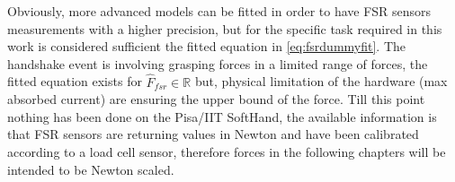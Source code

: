 Obviously, more advanced models can be fitted in order to have FSR sensors measurements with a higher precision, but for the specific task required in this work is considered sufficient the fitted equation in \eqref{eq:fsrdummyfit}. The handshake event is involving grasping forces in a limited range of forces, the fitted equation exists for $ \hat{F}_{fsr} \in \mathbb{R}$ but, physical limitation of the hardware (max absorbed current) are ensuring the upper bound of the force. Till this point nothing has been done on the Pisa/IIT SoftHand, the available information is that FSR sensors are returning values in Newton and have been calibrated according to a load cell sensor, therefore forces in the following chapters will be intended to be Newton scaled. 
